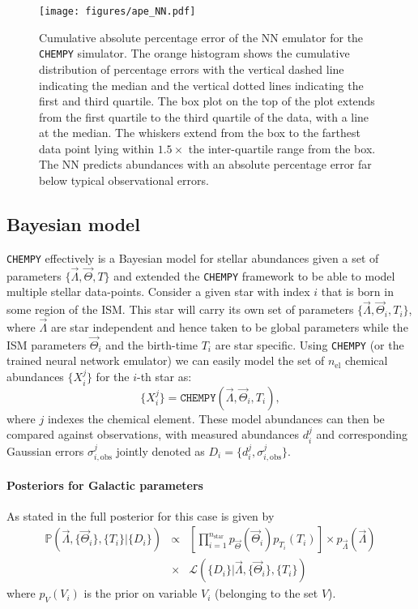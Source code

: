 \documentclass{aa}
\begin{document}
\begin{figure}[]
     \centering
     \texttt{[image: figures/ape\_NN.pdf]}
     \vspace{-.5cm}
     \caption{Cumulative absolute percentage error of the NN emulator for the \texttt{CHEMPY} simulator. The orange histogram shows the cumulative distribution of percentage errors with the vertical dashed line indicating the median and the vertical dotted lines indicating the first and third quartile. The box plot on the top of the plot extends from the first quartile to the third quartile of the data, with a line at the median. The whiskers extend from the box to the farthest data point lying within $1.5\times$ the inter-quartile range from the box. The NN predicts abundances with an absolute percentage error far below typical observational errors.}
     \label{fig:ape_NN}
\end{figure}


\subsection{Bayesian model}
\texttt{CHEMPY} effectively is a Bayesian model for stellar abundances given a set of parameters $\{\Vec{\Lambda},\Vec{\Theta},T\}$ and \citet{Philcox_2019} extended the \texttt{CHEMPY} framework to be able to model multiple stellar data-points. Consider a given star with index $i$ that is born in some region of the ISM. This star will carry its own set of parameters $\{\Vec{\Lambda},\Vec{\Theta}_i,T_i\}$, where $\Vec{\Lambda}$ are star independent and hence taken to be global parameters while the ISM parameters $\Vec{\Theta}_i$ and the birth-time $T_i$ are star specific. Using \texttt{CHEMPY} (or the trained neural network emulator) we can easily model the set of $n_\mathrm{el}$ chemical abundances $\{X_i^j\}$ for the $i$-th star as: 
\begin{equation}\label{eq:chempy_function}
\{X_i^j\} = \texttt{CHEMPY}(\Vec{\Lambda},\Vec{\Theta}_i,T_i),
\end{equation}
where $j$ indexes the chemical element. 
These model abundances can then be compared against observations, with measured abundances $d_i^j$ and corresponding Gaussian errors $\sigma_{i,\mathrm{obs}}^j$ jointly denoted as $D_i=\{d_i^j,\sigma_{i,\mathrm{obs}}^j\}$.

\paragraph{Posteriors for Galactic parameters}
As stated in \citet{Philcox_2019} the full posterior for this case is given by 
\begin{eqnarray}\label{eq:posterior}
    \mathbb{P}(\vec\Lambda,\{\vec\Theta_i\},\{T_i\}|\{D_i\}) &\propto&  \left[\prod_{i=1}^{n_\mathrm{star}}p_{\vec\Theta}(\vec\Theta_i)p_{T_i}(T_i)\right]
    \times p_{\vec\Lambda}(\vec\Lambda)\\
    \nonumber
    &\times& \mathcal{L}(\{D_i\}|\vec\Lambda,\{\vec\Theta_i\},\{T_i\})
\end{eqnarray}
where $p_V(V_i)$ is the prior on variable $V_i$ (belonging to the set $V$).
\end{document}
